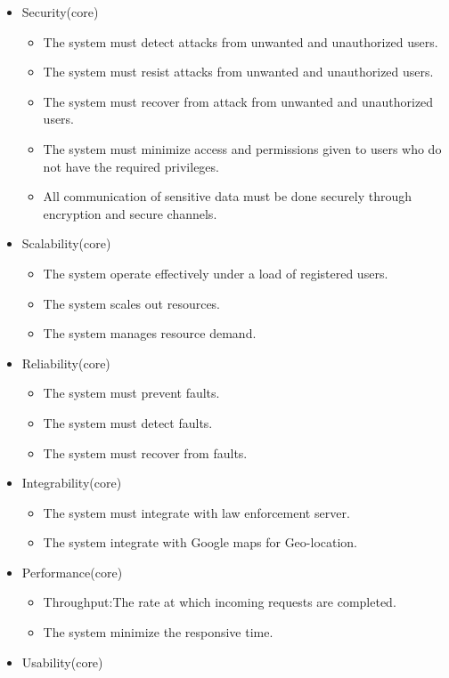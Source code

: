 \documentclass[a4paper,12pt]{article}
\begin{document}
	\begin{itemize}
	\item Security(core)
	\begin{itemize}
		\item The system must detect attacks from unwanted and unauthorized users.
		\item The system must resist attacks from unwanted and unauthorized users.
		\item The system must recover from attack from unwanted and unauthorized users.
		\item The system must minimize access and permissions given to users who do not have the
			required privileges.
		\item All communication of sensitive data must be done securely through
			encryption and secure channels.
	\end{itemize}
	\item Scalability(core)
	\begin{itemize}
		\item The system operate effectively under a load of registered users.
		\item The system scales out resources.
		\item The system manages resource demand.
	\end{itemize}
	\item Reliability(core)
		\begin{itemize}
			\item The system must prevent faults.
			\item The system must detect faults.
			\item The system must recover from faults.
		\end{itemize}
	\item Integrability(core)
		\begin{itemize}
			\item The system must integrate with law enforcement server.
			\item The system integrate with Google maps for Geo-location.
		\end{itemize}
	\item Performance(core)
		\begin{itemize}
			\item Throughput:The rate at which incoming requests are completed.
			\item The system minimize the responsive time.
		\end{itemize}
	\item Usability(core)

\end{itemize}
\end{document}
